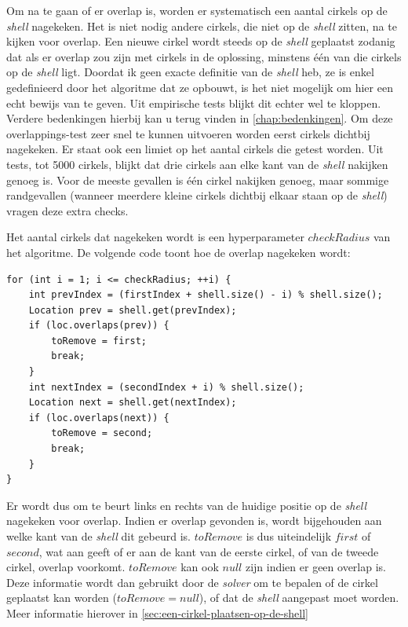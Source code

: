 \documentclass[12pt,a4paper,oneside]{book}
\begin{document}
{Om na te gaan of er overlap is, worden er systematisch een aantal cirkels op de \textit{shell} nagekeken.
Het is niet nodig andere cirkels, die niet op de \textit{shell} zitten, na te kijken voor overlap.
Een nieuwe cirkel wordt steeds op de \textit{shell} geplaatst zodanig dat als er overlap zou zijn met cirkels in de oplossing, minstens één van die cirkels op de \textit{shell} ligt.
Doordat ik geen exacte definitie van de \textit{shell} heb, ze is enkel gedefinieerd door het algoritme dat ze opbouwt, is het niet mogelijk om hier een echt bewijs van te geven.
Uit empirische tests blijkt dit echter wel te kloppen.
Verdere bedenkingen hierbij kan u terug vinden in \autoref{chap:bedenkingen}.
Om deze overlappings-test zeer snel te kunnen uitvoeren worden eerst cirkels dichtbij nagekeken.
Er staat ook een limiet op het aantal cirkels die getest worden.
Uit tests, tot 5000 cirkels, blijkt dat drie cirkels aan elke kant van de \textit{shell} nakijken genoeg is.
Voor de meeste gevallen is één cirkel nakijken genoeg, maar sommige randgevallen (wanneer meerdere kleine cirkels dichtbij elkaar staan op de \textit{shell}) vragen deze extra checks.

Het aantal cirkels dat nagekeken wordt is een hyperparameter $checkRadius$ van het algoritme.
De volgende code toont hoe de overlap nagekeken wordt:

\begin{lstlisting}
for (int i = 1; i <= checkRadius; ++i) {
	int prevIndex = (firstIndex + shell.size() - i) % shell.size();
	Location prev = shell.get(prevIndex);
	if (loc.overlaps(prev)) {
		toRemove = first;
		break;
	}
	int nextIndex = (secondIndex + i) % shell.size();
	Location next = shell.get(nextIndex);
	if (loc.overlaps(next)) {
		toRemove = second;
		break;
	}
}
\end{lstlisting}

Er wordt dus om te beurt links en rechts van de huidige positie op de \textit{shell} nagekeken voor overlap.
Indien er overlap gevonden is, wordt bijgehouden aan welke kant van de \textit{shell} dit gebeurd is.
$toRemove$ is dus uiteindelijk $first$ of $second$, wat aan geeft of er aan de kant van de eerste cirkel, of van de tweede cirkel, overlap voorkomt.
$toRemove$ kan ook $null$ zijn indien er geen overlap is.
Deze informatie wordt dan gebruikt door de \textit{solver} om te bepalen of de cirkel geplaatst kan worden ($toRemove = null$), of dat de \textit{shell} aangepast moet worden.
Meer informatie hierover in \autoref{sec:een-cirkel-plaatsen-op-de-shell}

}
\end{document}
